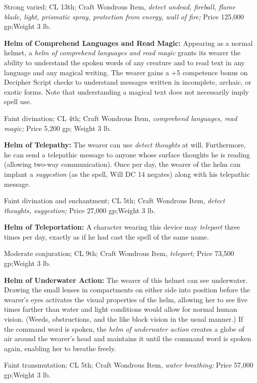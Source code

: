 \documentclass{article}
\begin{document}
Strong varied; CL 13th; Craft Wondrous Item, \textit{detect undead, fireball, flame 
blade, light, prismatic spray, protection from energy, wall of fire; }Price 125,000 
gp;Weight 3 lb.

\textbf{Helm of Comprehend Languages and Read Magic:} Appearing as a normal helmet, 
a \textit{helm of comprehend languages and read magic }grants its wearer the ability 
to understand the spoken words of any creature and to read text in any language 
and any magical writing. The wearer gains a +5 competence bonus on Decipher Script 
checks to understand messages written in incomplete, archaic, or exotic forms. 
Note that understanding a magical text does not necessarily imply spell use.

Faint divination; CL 4th; Craft Wondrous Item, \textit{comprehend languages, read 
magic; }Price 5,200 gp; Weight 3 lb.

\textbf{Helm of Telepathy: }The wearer can use \textit{detect thoughts }at will. 
Furthermore, he can send a telepathic message to anyone whose surface thoughts 
he is reading (allowing two-way communication). Once per day, the wearer of the 
helm can implant a \textit{suggestion }(as the spell, Will DC 14 negates) along 
with his telepathic message.

Faint divination and enchantment; CL 5th; Craft Wondrous Item, \textit{detect thoughts, 
suggestion; }Price 27,000 gp;Weight 3 lb.

\textbf{Helm of Teleportation:} A character wearing this device may \textit{teleport 
}three times per day, exactly as if he had cast the spell of the same name.

Moderate conjuration; CL 9th; Craft Wondrous Item, \textit{teleport; }Price 73,500 
gp;Weight 3 lb.

\textbf{Helm of Underwater Action:} The wearer of this helmet can see underwater. 
Drawing the small lenses in compartments on either side into position before the 
wearer's eyes activates the visual properties of the helm, allowing her to see 
five times farther than water and light conditions would allow for normal human 
vision. (Weeds, obstructions, and the like block vision in the usual manner.) If 
the command word is spoken, the \textit{helm of underwater action }creates a globe 
of air around the wearer's head and maintains it until the command word is spoken 
again, enabling her to breathe freely.

Faint transmutation; CL 5th; Craft Wondrous Item, \textit{water breathing; }Price 
57,000 gp;Weight 3 lb.
\end{document}
